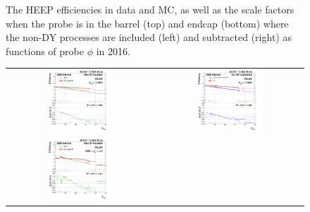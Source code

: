 \begin{figure}[htp]
\begin{center}
\begin{tabular}{cc}
    \end{tabular}
    \caption{The HEEP efficiencies in data and MC, as well as the scale factors when the probe is in the barrel (top) and endcap (bottom) where the non-DY processes are included (left) and subtracted (right) as functions of probe $\phi$ in 2016.}
    \label{fig:eff_SS_nominal_phi_2016}
  \end{center}
\end{figure}

\begin{figure}[bh]
  \begin{center}
    \begin{tabular}{cc}
      \includegraphics[width=0.45\textwidth]{figures/Zprime/2016/ScaleFactor/SameSign/nominal/g_compare_cut_nVtx_Barrel_ea_ta_inc_AS_nominal_PUW.png} &
      \includegraphics[width=0.45\textwidth]{figures/Zprime/2016/ScaleFactor/SameSign/nominal/g_compare_cut_nVtx_Barrel_ea_ta_exc_AS_nominal_PUW.png} \\
      \includegraphics[width=0.45\textwidth]{figures/Zprime/2016/ScaleFactor/SameSign/nominal/g_compare_cut_nVtx_Endcap_ea_ta_inc_AS_nominal_PUW.png} &

\end{tabular}
\end{center}
\end{figure}

